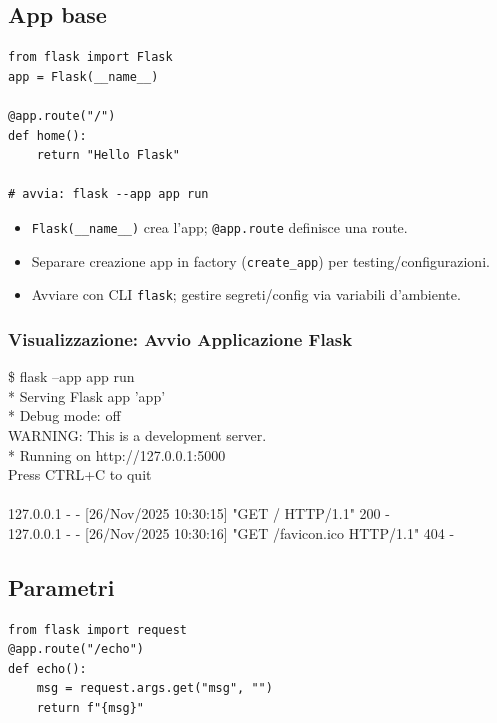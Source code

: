 \subsection{App base}
\begin{lstlisting}
from flask import Flask
app = Flask(__name__)

@app.route("/")
def home():
    return "Hello Flask"

# avvia: flask --app app run
\end{lstlisting}

\begin{tcolorbox}[title=Spiegazione]
\begin{itemize}
  \item \texttt{Flask(\_\_name\_\_)} crea l'app; \texttt{@app.route} definisce una route.
  \item Separare creazione app in factory (\texttt{create\_app}) per testing/configurazioni.
  \item Avviare con CLI \texttt{flask}; gestire segreti/config via variabili d'ambiente.
\end{itemize}
\end{tcolorbox}

\subsubsection{Visualizzazione: Avvio Applicazione Flask}
\begin{tcolorbox}[title=Output Terminale: Avvio Flask, colback=black, coltext=green!80, fontupper=\ttfamily\small]
\$ flask --app app run\\
* Serving Flask app 'app'\\
* Debug mode: off\\
WARNING: This is a development server.\\
* Running on http://127.0.0.1:5000\\
Press CTRL+C to quit\\
\\
127.0.0.1 - - [26/Nov/2025 10:30:15] "GET / HTTP/1.1" 200 -\\
127.0.0.1 - - [26/Nov/2025 10:30:16] "GET /favicon.ico HTTP/1.1" 404 -
\end{tcolorbox}

\subsection{Parametri}
\begin{lstlisting}
from flask import request
@app.route("/echo")
def echo():
    msg = request.args.get("msg", "")
    return f"{msg}"
\end{lstlisting}

